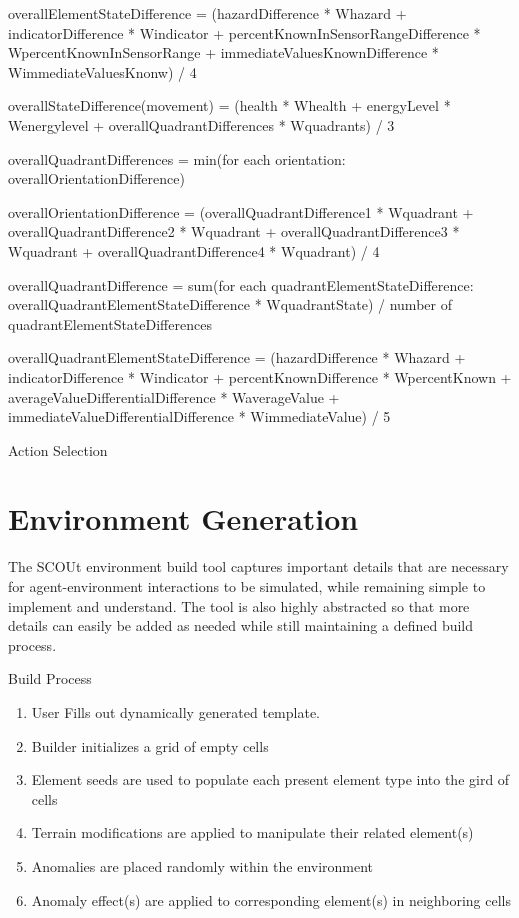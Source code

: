 overallElementStateDifference = (hazardDifference * Whazard + indicatorDifference * Windicator + percentKnownInSensorRangeDifference * WpercentKnownInSensorRange + immediateValuesKnownDifference * WimmediateValuesKnonw) / 4

overallStateDifference(movement) = (health * Whealth + energyLevel * Wenergylevel + overallQuadrantDifferences * Wquadrants) / 3

overallQuadrantDifferences = min(for each orientation: overallOrientationDifference)

overallOrientationDifference = (overallQuadrantDifference1 * Wquadrant + overallQuadrantDifference2 * Wquadrant + overallQuadrantDifference3 * Wquadrant + overallQuadrantDifference4 * Wquadrant) / 4

overallQuadrantDifference = sum(for each quadrantElementStateDifference: overallQuadrantElementStateDifference * WquadrantState) / number of quadrantElementStateDifferences

overallQuadrantElementStateDifference = (hazardDifference * Whazard + indicatorDifference * Windicator + percentKnownDifference * WpercentKnown + averageValueDifferentialDifference * WaverageValue + immediateValueDifferentialDifference * WimmediateValue) / 5





Action Selection



\section{Environment Generation}
The SCOUt environment build tool captures important details that are necessary for agent-environment interactions to be simulated, while remaining simple to implement and understand.
The tool is also highly abstracted so that more details can easily be added as needed while still maintaining a defined build process.

Build Process
\begin{enumerate}
  \item User Fills out dynamically generated template. 
  \item	Builder initializes a grid of empty cells
  \item	Element seeds are used to populate each present element type into the gird of cells
  \item	Terrain modifications are applied to manipulate their related element(s)
  \item	Anomalies are placed randomly within the environment
  \item	Anomaly effect(s) are applied to corresponding element(s) in neighboring cells
\end{enumerate}


